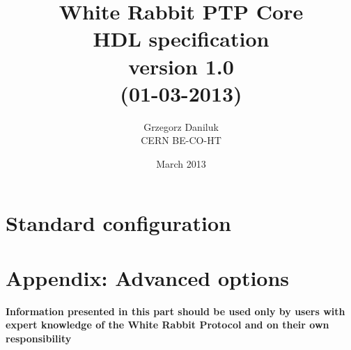 \documentclass[a4paper, 12pt]{article}
\begin{document}
\title{White Rabbit PTP Core \\ HDL specification\\\normalsize
{version 1.0}\\\small{(01-03-2013)}}
\author{Grzegorz Daniluk\\ CERN BE-CO-HT}

\date{March 2013}
\maketitle
\thispagestyle{empty}

\begin{figure}[ht!]
  \centering
  \vspace{1.3cm}
  \label{fig:wr_logo}
\end{figure}

\newpage

%

\newpage

\newpage

\tableofcontents

\newpage


\newpage
\section{Standard configuration}







\newpage
\appendix
\section{Appendix: Advanced options}
{\color{red} {\bf Information presented in this part should be used only
    by users with expert knowledge of the White Rabbit Protocol and on their own
responsibility}}






\newpage



%
\end{document}
